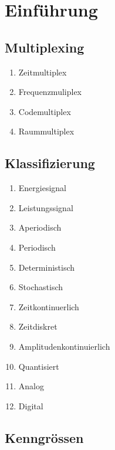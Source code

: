 \section{Einführung}

\subsection{Multiplexing}

\begin{enumerate}[nosep]
	\item Zeitmultiplex
	\item Frequenzmuliplex
	\item Codemultiplex
	\item Raummultiplex
\end{enumerate}

\subsection{Klassifizierung}
\begin{enumerate}[nosep]
	\item Energiesignal
	\item Leistungssignal
	\item Aperiodisch
	\item Periodisch
	\item Deterministisch
	\item Stochastisch
	\item Zeitkontinuerlich
	\item Zeitdiskret
	\item Amplitudenkontinuierlich
	\item Quantisiert
	\item Analog
	\item Digital
\end{enumerate}

\subsection{Kenngrössen} 


